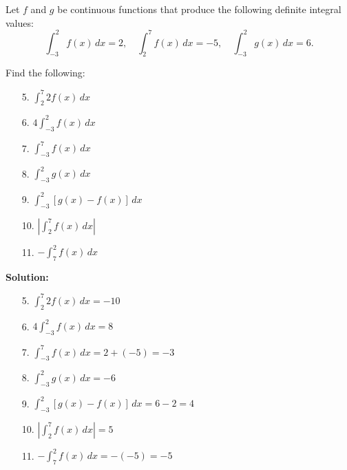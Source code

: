 \documentclass[12pt]{article}
\theoremstyle{beautifulthm}
\begin{document}
\begin{tcolorbox}[colback=examplebg, colframe=red!75!black, title=\textbf{EXAMPLE 1: Find the Integral}, fonttitle=\bfseries, sharp corners]
Let $f$ and $g$ be continuous functions that produce the following definite integral values:
\[
\int_{-3}^{2} f(x) \, dx = 2, \quad \int_{2}^{7} f(x) \, dx = -5, \quad \int_{-3}^{2} g(x) \, dx = 6.
\]

Find the following:

\begin{enumerate}
    \item[5.] $\int_{2}^{7} 2f(x) \, dx$
    \item[6.] $4 \int_{-3}^{2} f(x) \, dx$
    \item[7.] $\int_{-3}^{7} f(x) \, dx$
    \item[8.] $\int_{-3}^{2} g(x) \, dx$
    \item[9.] $\int_{-3}^{2} [g(x) - f(x)] \, dx$
    \item[10.] $\left|\int_{2}^{7} f(x) \, dx\right|$
    \item[11.] $-\int_{7}^{2} f(x) \, dx$
\end{enumerate}



\tcblower
\textbf{Solution:} 
\begin{enumerate}
    \item[5.] $\int_{2}^{7} 2f(x) \, dx = -10$
    \item[6.] $4 \int_{-3}^{2} f(x) \, dx = 8$
    \item[7.] $\int_{-3}^{7} f(x) \, dx = 2 + (-5) = -3$
    \item[8.] $\int_{-3}^{2} g(x) \, dx = -6$
    \item[9.] $\int_{-3}^{2} [g(x) - f(x)] \, dx = 6 - 2 = 4$
    \item[10.] $\left|\int_{2}^{7} f(x) \, dx\right| = 5$
    \item[11.] $-\int_{7}^{2} f(x) \, dx = -(-5) = -5$
\end{enumerate}



\end{tcolorbox}
\end{document}
